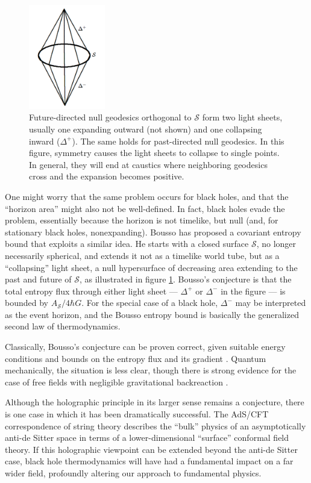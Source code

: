 \documentclass[11pt]{article}
\begin{document}
\begin{figure}
\centerline{\includegraphics[height=1.8in]{Bousso.pdf}}
\caption{Future-directed null geodesics orthogonal to
$\mathcal{S}$ form two light sheets, usually one expanding outward 
(not shown) and one collapsing inward ($\Delta^+$).  The same holds
for past-directed null geodesics.  In this figure, symmetry causes 
the light sheets to collapse to single points.  In general, they will 
end at caustics where neighboring geodesics cross 
and the expansion becomes positive.}
\label{Carlipfig4}
\end{figure}
One might worry that the same problem occurs for black holes, and that
the ``horizon area'' might also not be well-defined.  In fact, black holes
evade the problem, essentially because the horizon is not timelike, but
null (and, for stationary black holes, nonexpanding).  Bousso \cite{Boussob}
has proposed a covariant entropy bound that exploits a similar idea.
He starts with a closed surface $\mathcal{S}$, no longer necessarily
spherical, and extends it not as a timelike world tube, but
as a ``collapsing'' light sheet, a null hypersurface of decreasing area
extending to the past and future of $\mathcal{S}$, as illustrated in figure
\ref{Carlipfig4}.  Bousso's conjecture is that the total 
entropy flux through either light sheet --- $\Delta^+$ or $\Delta^-$
in the figure --- is bounded by $A_{\mathcal{S}}/4\hbar G$.  For the
special case of a black hole, $\Delta^-$ may be interpreted as the
event horizon, and the Bousso entropy bound is basically the generalized
second law of thermodynamics.

Classically, Bousso's conjecture can be proven correct, given suitable
energy conditions and bounds on the entropy flux 
and its gradient \cite{Flanagan,BoussoFlan}.  Quantum mechanically, 
the situation is less clear, though there is strong evidence for the case 
of free fields with negligible gravitational backreaction \cite{BoussoMal}.

Although the holographic principle in its larger sense remains a conjecture,
there is one case in which it has been dramatically successful.  The
AdS/CFT correspondence of string theory \cite{Malda,AGMOO} describes
the ``bulk'' physics of an asymptotically anti-de Sitter space in terms
of a lower-dimensional ``surface'' conformal field theory.  If this
holographic viewpoint can be extended beyond the anti-de Sitter case,
black hole thermodynamics will have had a fundamental impact on a far
wider field, profoundly altering our approach to fundamental physics.
\end{document}
